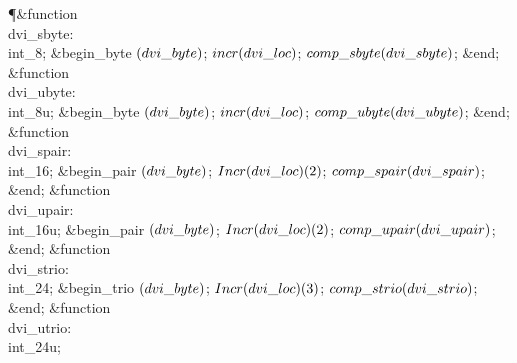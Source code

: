 \Y\P\4\&{function}\1\  \\{dvi\_sbyte}: \\{int\_8};\2\6
\&{begin\_byte} $(\\{dvi\_byte})$;\5
$\\{incr}(\\{dvi\_loc})$;\5
$\\{comp\_sbyte}(\\{dvi\_sbyte})$;\6
\&{end};\7
\4\&{function}\1\  \\{dvi\_ubyte}: \\{int\_8u};\2\6
\&{begin\_byte} $(\\{dvi\_byte})$;\5
$\\{incr}(\\{dvi\_loc})$;\5
$\\{comp\_ubyte}(\\{dvi\_ubyte})$;\6
\&{end};\7
\4\&{function}\1\  \\{dvi\_spair}: \\{int\_16};\2\6
\&{begin\_pair} $(\\{dvi\_byte})$;\5
$\\{Incr}(\\{dvi\_loc})(2)$;\5
$\\{comp\_spair}(\\{dvi\_spair})$;\6
\&{end};\7
\4\&{function}\1\  \\{dvi\_upair}: \\{int\_16u};\2\6
\&{begin\_pair} $(\\{dvi\_byte})$;\5
$\\{Incr}(\\{dvi\_loc})(2)$;\5
$\\{comp\_upair}(\\{dvi\_upair})$;\6
\&{end};\7
\4\&{function}\1\  \\{dvi\_strio}: \\{int\_24};\2\6
\&{begin\_trio} $(\\{dvi\_byte})$;\5
$\\{Incr}(\\{dvi\_loc})(3)$;\5
$\\{comp\_strio}(\\{dvi\_strio})$;\6
\&{end};\7
\4\&{function}\1\  \\{dvi\_utrio}: \\{int\_24u};\2\6
